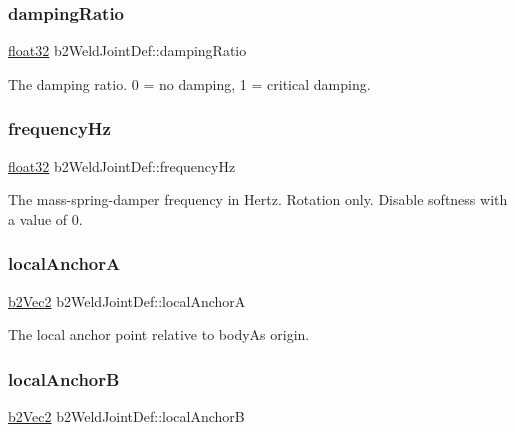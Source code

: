\subsubsection{\texorpdfstring{dampingRatio}{dampingRatio}}
{\footnotesize\ttfamily \mbox{\hyperlink{b2_settings_8h_aacdc525d6f7bddb3ae95d5c311bd06a1}{float32}} b2\+Weld\+Joint\+Def\+::damping\+Ratio}



The damping ratio. 0 = no damping, 1 = critical damping. 

\mbox{\label{structb2_weld_joint_def_abf42ce852914af845e9203b341f55c87}} 
\subsubsection{\texorpdfstring{frequencyHz}{frequencyHz}}
{\footnotesize\ttfamily \mbox{\hyperlink{b2_settings_8h_aacdc525d6f7bddb3ae95d5c311bd06a1}{float32}} b2\+Weld\+Joint\+Def\+::frequency\+Hz}

The mass-\/spring-\/damper frequency in Hertz. Rotation only. Disable softness with a value of 0. \mbox{\label{structb2_weld_joint_def_a3b04af6164bb32efc3f5cf3e8d2b7109}} 
\subsubsection{\texorpdfstring{localAnchorA}{localAnchorA}}
{\footnotesize\ttfamily \mbox{\hyperlink{structb2_vec2}{b2\+Vec2}} b2\+Weld\+Joint\+Def\+::local\+AnchorA}



The local anchor point relative to bodyA\textquotesingle{}s origin. 

\mbox{\label{structb2_weld_joint_def_a528262b92dac10de37411ad8c5637149}} 
\subsubsection{\texorpdfstring{localAnchorB}{localAnchorB}}
{\footnotesize\ttfamily \mbox{\hyperlink{structb2_vec2}{b2\+Vec2}} b2\+Weld\+Joint\+Def\+::local\+AnchorB}



